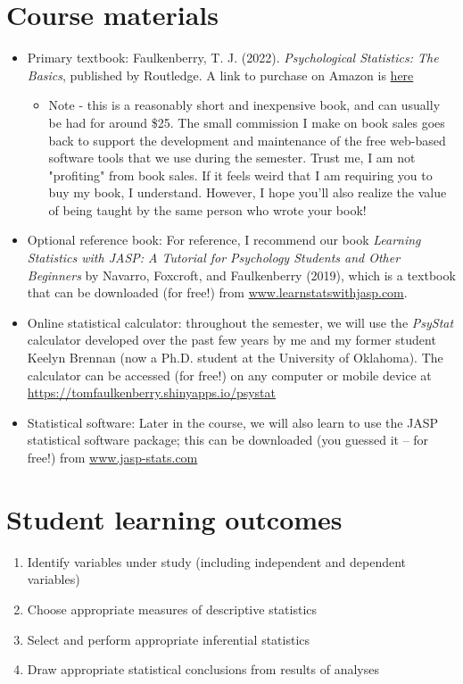 \documentclass[10pt]{article}
\begin{document}
\section*{Course materials}
\label{sec:org8fa2dba}
\begin{itemize}
\item Primary textbook: Faulkenberry, T. J. (2022). \emph{Psychological Statistics: The Basics}, published by Routledge. A link to purchase on Amazon is \href{https://www.amazon.com/Psychological-Statistics-Basics-Thomas-Faulkenberry/dp/1032020954/}{here}
\begin{itemize}
\item Note - this is a reasonably short and inexpensive book, and can usually be had for around \$25. The small commission I make on book sales goes back to support the development and maintenance of the free web-based software tools that we use during the semester. Trust me, I am not "profiting" from book sales. If it feels weird that I am requiring you to buy my book, I understand. However, I hope you'll also realize the value of being taught by the same person who wrote your book!
\end{itemize}

\item Optional reference book: For reference, I recommend our book \emph{Learning Statistics with JASP: A Tutorial for Psychology Students and Other Beginners} by Navarro, Foxcroft, and Faulkenberry (2019), which is a textbook that can be downloaded (for free!) from \href{http://learnstatswithjasp.com}{www.learnstatswithjasp.com}.

\item Online statistical calculator: throughout the semester, we will use the \emph{PsyStat} calculator developed over the past few years by me and my former student Keelyn Brennan (now a Ph.D. student at the University of Oklahoma). The calculator can be accessed (for free!) on any computer or mobile device at \url{https://tomfaulkenberry.shinyapps.io/psystat}

\item Statistical software: Later in the course, we will also learn to use the JASP statistical software package; this can be downloaded (you guessed it -- for free!) from \href{http://www.jasp-stats.com}{www.jasp-stats.com}
\end{itemize}

\section*{Student learning outcomes}
\label{sec:org3ae4974}
\begin{enumerate}
\item Identify variables under study (including independent and dependent variables)
\item Choose appropriate measures of descriptive statistics
\item Select and perform appropriate inferential statistics
\item Draw appropriate statistical conclusions from results of analyses
\end{enumerate}
\end{document}
